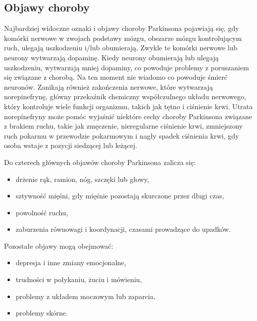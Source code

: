 
\subsection{Objawy choroby}
\label{subsec:objawy}

Najbardziej widoczne oznaki i objawy choroby Parkinsona pojawiają się, gdy komórki nerwowe w zwojach podstawy mózgu,
obszarze mózgu kontrolującym ruch, ulegają uszkodzeniu i/lub obumierają.
Zwykle te komórki nerwowe lub neurony wytwarzają dopaminę.
Kiedy neurony obumierają lub ulegają uszkodzeniu, wytwarzają mniej dopaminy, co powoduje problemy z poruszaniem się
związane z chorobą.
Na ten moment nie wiadomo co powoduje śmierć neuronów.
Zanikają również zakończenia nerwowe, które wytwarzają norepinefrynę, główny przekaźnik chemiczny
współczulnego układu nerwowego, który kontroluje wiele funkcji organizmu, takich jak tętno i ciśnienie krwi.
Utrata norepinefryny może pomóc wyjaśnić niektóre cechy choroby Parkinsona związane z brakiem ruchu, takie jak zmęczenie,
nieregularne ciśnienie krwi, zmniejszony ruch pokarmu w przewodzie pokarmowym i nagły spadek ciśnienia krwi, gdy osoba wstaje z pozycji siedzącej lub leżącej.

\vspace{0.5cm}
Do czterech głównych objawów choroby Parkinsona zalicza się:
\begin{itemize}[itemsep=0.05pt]
	\item drżenie rąk, ramion, nóg, szczęki lub głowy,
	\item sztywność mięśni, gdy mięśnie pozostają skurczone przez długi czas,
	\item powolność ruchu,
	\item zaburzenia równowagi i koordynacji, czasami prowadzące do upadków.
\end{itemize}

\vspace{0.15cm}
Pozostałe objawy mogą obejmować:
\begin{itemize}[itemsep=0.05pt]
	\item depresja i inne zmiany emocjonalne,
	\item trudności w połykaniu, żuciu i mówieniu,
	\item problemy z układem moczowym lub zaparcia,
	\item problemy skórne.
\end{itemize}


